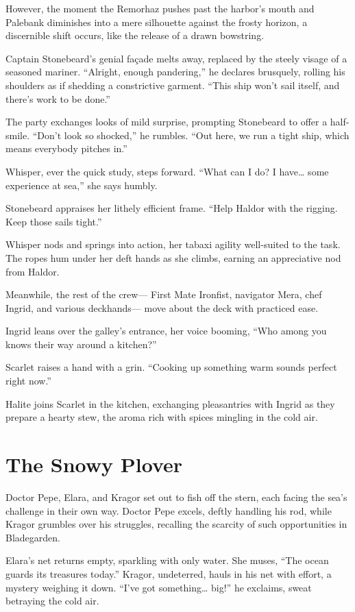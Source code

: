 \documentclass[
  letterpaper,12pt,twoside,twocolumn,openany,
  nodeprecatedcode,bg=full]{dndbook}
\begin{document}
However, the moment the Remorhaz pushes past the harbor's mouth and
Palebank diminishes into a mere silhouette against the frosty horizon, a
discernible shift occurs, like the release of a drawn bowstring.

Captain Stonebeard's genial façade melts away, replaced by the steely
visage of a seasoned mariner. ``Alright, enough pandering,'' he declares
brusquely, rolling his shoulders as if shedding a constrictive garment.
``This ship won't sail itself, and there's work to be done.''

The party exchanges looks of mild surprise, prompting Stonebeard to
offer a half-smile. ``Don't look so shocked,'' he rumbles. ``Out here,
we run a tight ship, which means everybody pitches in.''

Whisper, ever the quick study, steps forward. ``What can I do? I
have\ldots{} some experience at sea,'' she says humbly.

Stonebeard appraises her lithely efficient frame. ``Help Haldor with the
rigging. Keep those sails tight.''

Whisper nods and springs into action, her tabaxi agility well-suited to
the task. The ropes hum under her deft hands as she climbs, earning an
appreciative nod from Haldor.

Meanwhile, the rest of the crew--- First Mate Ironfist, navigator Mera,
chef Ingrid, and various deckhands--- move about the deck with practiced
ease.

Ingrid leans over the galley's entrance, her voice booming, ``Who among
you knows their way around a kitchen?''

Scarlet raises a hand with a grin. ``Cooking up something warm sounds
perfect right now.''

Halite joins Scarlet in the kitchen, exchanging pleasantries with Ingrid
as they prepare a hearty stew, the aroma rich with spices mingling in
the cold air.

\section{The Snowy Plover}\label{the-snowy-plover}

Doctor Pepe, Elara, and Kragor set out to fish off the stern, each
facing the sea's challenge in their own way. Doctor Pepe excels, deftly
handling his rod, while Kragor grumbles over his struggles, recalling
the scarcity of such opportunities in Bladegarden.

Elara's net returns empty, sparkling with only water. She muses, ``The
ocean guards its treasures today.'' Kragor, undeterred, hauls in his net
with effort, a mystery weighing it down. ``I've got something\ldots{}
big!'' he exclaims, sweat betraying the cold air.
\end{document}
